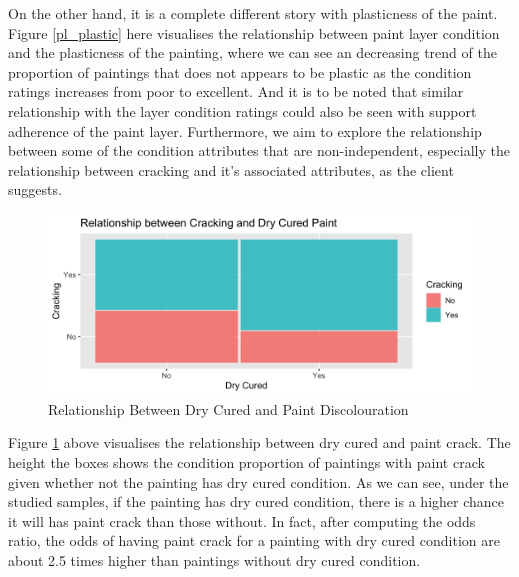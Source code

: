 \documentclass[11pt, oneside]{article}
\begin{document}
\noindent On the other hand, it is a complete different story with plasticness of the paint. Figure \ref{pl_plastic} here visualises the relationship between paint layer condition and the plasticness of the painting, where we can see an decreasing trend of the proportion of paintings that does not appears to be plastic as the condition ratings increases from poor to excellent. And it is to be noted that similar relationship with the layer condition ratings could also be seen with support adherence of the paint layer.
\bigbreak
\noindent Furthermore, we aim to explore the relationship between some of the condition attributes that are non-independent, especially the relationship between cracking and it's associated attributes, as the client suggests.

\begin{figure}[H]
    \centering
    \includegraphics[scale=0.2]{images/dry_crack.png}
    \caption{Relationship Between Dry Cured and Paint Discolouration}
    \label{dry_crack}
\end{figure}

\noindent Figure \ref{dry_crack} above visualises the relationship between dry cured and paint crack. The height the boxes shows the condition proportion of paintings with paint crack given whether not the painting has dry cured condition. As we can see, under the studied samples, if the painting has dry cured condition, there is a higher chance it will has paint crack than those without. In fact, after computing the odds ratio, the odds of having paint crack for a painting with dry cured condition are about 2.5 times higher than paintings without dry cured condition.
\end{document}
